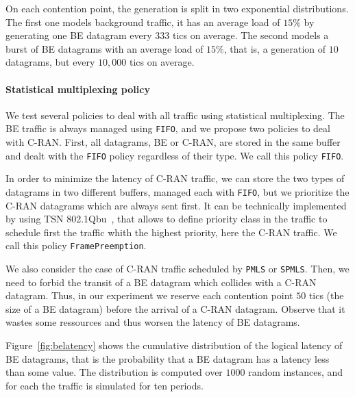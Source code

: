 \documentclass[a4paper,10pt]{article}
\newcommand\PMLS{\texttt{PMLS}\xspace}
\newcommand\SPMLS{\texttt{SPMLS}\xspace}
\newcommand\FIFO{\texttt{FIFO}\xspace}
\newcommand\framepre{\texttt{FramePreemption}\xspace}
\begin{document}
    On each contention point, the generation is split in two exponential distributions. The first one models 
    background traffic, it has an average load of $15\%$ by generating one BE datagram every $333$ tics on average. The second models a burst of BE datagrams with an average load of $15\%$, that is, a generation of $10$ datagrams, but every $10,000$ tics on average. 
   
   	\paragraph{Statistical multiplexing policy}

   	We test several policies to deal with all traffic using statistical multiplexing.
   	The BE traffic is always managed using \FIFO, and we propose two policies to deal with C-RAN. First, all datagrams, BE or C-RAN, are stored in the same buffer and dealt with the \FIFO policy regardless of their type. We call this policy \FIFO.

    In order to minimize the latency of C-RAN traffic, we can store the two types of datagrams in two different buffers, managed each with \FIFO, but we prioritize the C-RAN datagrams which are always sent first. It can be technically implemented by using TSN 802.1Qbu~\cite{ieee802}, that allows to define priority class in the traffic to schedule first the traffic whith the highest priority, here the C-RAN traffic. We call this policy \framepre.
    
    We also consider the case of C-RAN traffic scheduled by \PMLS or \SPMLS. Then, we need to forbid the transit of a BE datagram which collides with a C-RAN datagram. Thus, in our experiment we reserve each contention point $50$ tics (the size of a BE datagram) before the arrival of a C-RAN datagram. Observe that
    it wastes some ressources and thus worsen the latency of BE datagrams.
    
    Figure~\ref{fig:belatency} shows the cumulative distribution of the logical latency of BE datagrams, that is the probability that a BE datagram has a latency less than some value.
    The distribution is computed over $1000$ random instances, and for each the traffic is simulated for ten periods.
\end{document}
